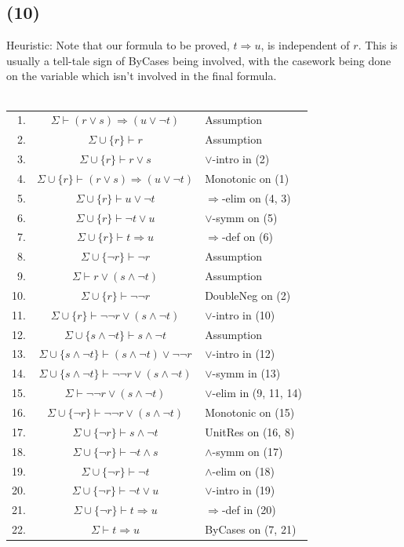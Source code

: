 \documentclass{article}
\begin{document}
\subsection*{(10)}
Heuristic: Note that our formula to be proved, $t\Rightarrow u$, is independent of $r$. This is usually a tell-tale sign of ByCases being involved, with the casework being done on the variable which isn't involved in the final formula.\\
\\
\begin{tabular}{r c l}
    1. & $\Sigma\vdash (r\lor s)\Rightarrow(u\lor\lnot t)$ & Assumption\\
    2. & $\Sigma\cup\{r\}\vdash r$ & Assumption\\
    3. & $\Sigma\cup\{r\}\vdash r\lor s$ & $\lor$-intro in (2)\\
    4. & $\Sigma\cup\{r\}\vdash (r\lor s)\Rightarrow(u\lor\lnot t)$ & Monotonic on (1)\\
    5. & $\Sigma\cup\{r\}\vdash u\lor\lnot t$ & $\Rightarrow$-elim on (4, 3)\\
    6. & $\Sigma\cup\{r\}\vdash \lnot t\lor u$ & $\lor$-symm on (5)\\
    7. & $\Sigma\cup\{r\}\vdash t\Rightarrow u$ & $\Rightarrow$-def on (6)\\
    8. & $\Sigma\cup\{\lnot r\}\vdash \lnot r$ & Assumption\\
    9. & $\Sigma\vdash r\lor(s\wedge\lnot t)$ & Assumption\\
    10. & $\Sigma\cup\{r\}\vdash \lnot\lnot r$ & DoubleNeg on (2)\\
    11. & $\Sigma\cup\{r\}\vdash \lnot\lnot r\lor(s\wedge\lnot t)$ & $\lor$-intro in (10)\\
    12. & $\Sigma\cup\{s\wedge\lnot t\}\vdash s\wedge\lnot t$ & Assumption\\
    13. & $\Sigma\cup\{s\wedge\lnot t\}\vdash (s\wedge\lnot t)\lor\lnot\lnot r$ & $\lor$-intro in (12)\\
    14. & $\Sigma\cup\{s\wedge\lnot t\}\vdash \lnot\lnot r\lor(s\wedge\lnot t)$ & $\lor$-symm in (13)\\
    15. & $\Sigma\vdash \lnot\lnot r\lor(s\wedge\lnot t)$ & $\lor$-elim in (9, 11, 14)\\
    16. & $\Sigma\cup\{\lnot r\}\vdash \lnot\lnot r\lor(s\wedge\lnot t)$ & Monotonic on (15)\\
    17. & $\Sigma\cup\{\lnot r\}\vdash s\wedge\lnot t$ & UnitRes on (16, 8)\\
    18. & $\Sigma\cup\{\lnot r\}\vdash \lnot t\wedge s$ & $\wedge$-symm on (17)\\
    19. & $\Sigma\cup\{\lnot r\}\vdash \lnot t$ & $\wedge$-elim on (18)\\
    20. & $\Sigma\cup\{\lnot r\}\vdash \lnot t\lor u$ & $\lor$-intro in (19)\\
    21. & $\Sigma\cup\{\lnot r\}\vdash t\Rightarrow u$ & $\Rightarrow$-def in (20)\\
    22. & $\Sigma\vdash t\Rightarrow u$ & ByCases on (7, 21)\\
\end{tabular}
\end{document}
